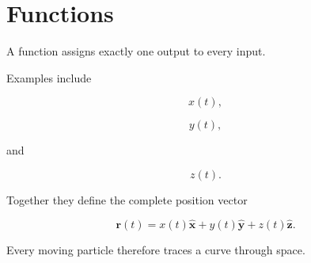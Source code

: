 \section{Functions}

A function assigns exactly one output to every input.

Examples include

\[
x(t),
\]

\[
y(t),
\]

and

\[
z(t).
\]

Together they define the complete position vector

\[
\boxed{
	\mathbf r(t)
	=
	x(t)\hat{\mathbf x}
	+
	y(t)\hat{\mathbf y}
	+
	z(t)\hat{\mathbf z}.
}
\]

Every moving particle therefore traces a curve through space.


